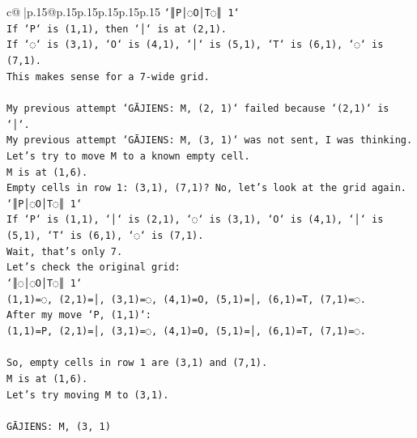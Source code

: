 \documentclass{article}
\begin{document}
{\begin{supertabular}{c@{$\;$}|p{.15\linewidth}@{}p{.15\linewidth}p{.15\linewidth}p{.15\linewidth}p{.15\linewidth}p{.15\linewidth}}
{{{\texttt{`║P│◌O│T◌║ 1`} \\
\texttt{If `P` is (1,1), then `│` is at (2,1).} \\
\texttt{If `◌` is (3,1), `O` is (4,1), `│` is (5,1), `T` is (6,1), `◌` is (7,1).} \\
\texttt{This makes sense for a 7{-}wide grid.} \\
\\ 
\texttt{My previous attempt `GĀJIENS: M, (2, 1)` failed because `(2,1)` is `│`.} \\
\texttt{My previous attempt `GĀJIENS: M, (3, 1)` was not sent, I was thinking.} \\
\texttt{Let's try to move M to a known empty cell.} \\
\texttt{M is at (1,6).} \\
\texttt{Empty cells in row 1: (3,1), (7,1)? No, let's look at the grid again.} \\
\texttt{`║P│◌O│T◌║ 1`} \\
\texttt{If `P` is (1,1), `│` is (2,1), `◌` is (3,1), `O` is (4,1), `│` is (5,1), `T` is (6,1), `◌` is (7,1).} \\
\texttt{Wait, that's only 7.} \\
\texttt{Let's check the original grid:} \\
\texttt{`║◌│◌O│T◌║ 1`} \\
\texttt{(1,1)=◌, (2,1)=│, (3,1)=◌, (4,1)=O, (5,1)=│, (6,1)=T, (7,1)=◌.} \\
\texttt{After my move `P, (1,1)`:} \\
\texttt{(1,1)=P, (2,1)=│, (3,1)=◌, (4,1)=O, (5,1)=│, (6,1)=T, (7,1)=◌.} \\
\\ 
\texttt{So, empty cells in row 1 are (3,1) and (7,1).} \\
\texttt{M is at (1,6).} \\
\texttt{Let's try moving M to (3,1).} \\
\\ 
\texttt{GĀJIENS: M, (3, 1)} \\
            }
        }
    }
     \\ \\


\end{supertabular}}
\end{document}
